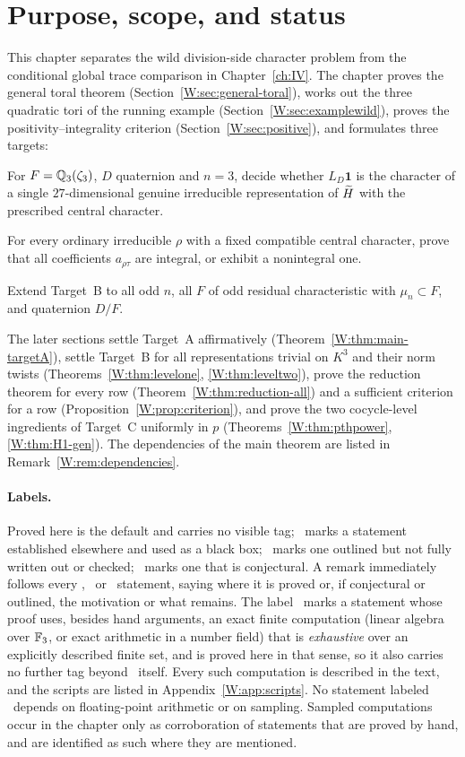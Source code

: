 \section{Purpose, scope, and status}\label{W:sec:intro}
This chapter separates the wild division-side character problem from the
conditional global trace comparison in Chapter~\ref{ch:IV}.
The chapter proves the general toral theorem (Section~\ref{W:sec:general-toral}),
works out the three quadratic tori of the running example
(Section~\ref{W:sec:examplewild}), proves the positivity--integrality
criterion (Section~\ref{W:sec:positive}), and formulates three targets:
\begin{description}[style=nextline]
\item[Target A] For $F=\mathbb Q_3(\zeta_3)$, $D$ quaternion and $n=3$, decide
whether $L_D\mathbf1$ is the character of a single $27$-dimensional
genuine irreducible representation of $\widetilde H$ with the prescribed central
character.
\item[Target B] For every ordinary irreducible $\rho$ with a fixed
compatible central character, prove that all coefficients $a_{\rho\tau}$
are integral, or exhibit a nonintegral one.
\item[Target C] Extend Target~B to all odd $n$, all $F$ of odd residual
characteristic with $\mu_n\subset F$, and quaternion $D/F$.
\end{description}
The later sections settle Target~A affirmatively (Theorem~\ref{W:thm:main-targetA}),
settle Target~B for all representations trivial on $K^3$ and their norm
twists (Theorems~\ref{W:thm:levelone}, \ref{W:thm:leveltwo}), prove the reduction theorem for
every row (Theorem~\ref{W:thm:reduction-all}) and a sufficient criterion
for a row (Proposition~\ref{W:prop:criterion}), and prove the two
cocycle-level ingredients of Target~C uniformly in $p$
(Theorems~\ref{W:thm:pthpower}, \ref{W:thm:H1-gen}).  The dependencies of
the main theorem are listed in Remark~\ref{W:rem:dependencies}.

\paragraph{Labels.}
Proved here is the default and carries no visible tag; \Etag\ marks a
statement established elsewhere and used as a black box; \Otag\
marks one outlined but not fully written out or checked; \Ctag\ marks
one that is conjectural. A remark immediately follows every
\Etag, \Otag\ or \Ctag\ statement, saying where it is proved or, if
conjectural or outlined, the motivation or what remains. The label
\Pctag\ marks a statement whose proof uses, besides hand arguments, an
exact finite computation (linear algebra over $\mathbb F_3$, or exact
arithmetic in a number field) that is \emph{exhaustive} over an
explicitly described finite set, and is proved here in that sense, so
it also carries no further tag beyond \Pctag\ itself. Every such
computation is described in the text, and the scripts are listed in
Appendix~\ref{W:app:scripts}. No statement labeled \Pctag\ depends on
floating-point arithmetic or on sampling. Sampled computations occur
in the chapter only as corroboration of statements that are proved by
hand, and are identified as such where they are mentioned.

